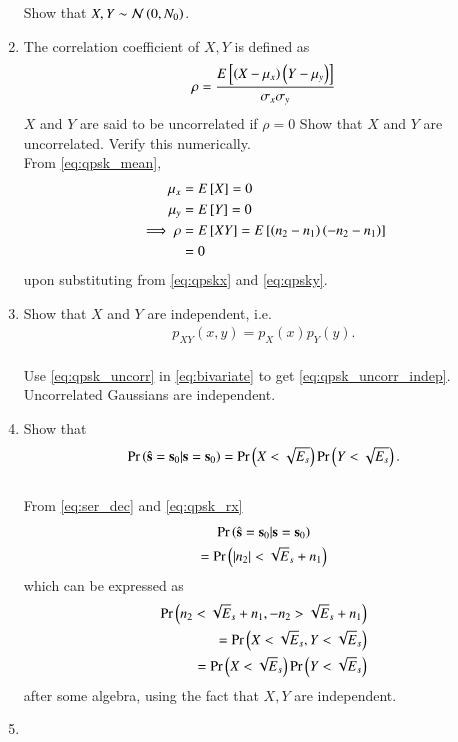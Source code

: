 \documentclass[journal,12pt,twocolumn]{IEEEtran}
\renewcommand\thesection{\arabic{section}}
\begin{document}
\begin{enumerate}[label=\arabic*.,ref=\thesection.\theenumi]
Show that $X,Y \sim \mathcal{N}\left(0,N_0\right)$.

\item The correlation coefficient of $X, Y$ is defined as
%
\begin{align}
\rho = \frac{E{}\left[\left(X-\mu_x\right)\left(Y-\mu_y\right)\right]}{\sigma_x\sigma_y}
\end{align}
%
$X$ and $Y$ are said to be uncorrelated if $\rho = 0$
Show that  $X$ and $Y$ are uncorrelated. 
Verify this numerically.
\\
\solution From \eqref{eq:qpsk_mean},
\begin{align}
\mu_x &= E{}\left[X\right] = 0
\\
\mu_y &= E{}\left[Y\right] = 0
\\
\implies \rho &= E{}\left[XY\right] = E{}\left[\left(n_2-n_1\right)\left(-n_2-n_1\right)\right] 
\nonumber \\
&= 0
\label{eq:qpsk_uncorr}
\end{align}
%
upon substituting from \eqref{eq:qpskx} and \eqref{eq:qpsky}.
\item
Show that $X$ and $Y$ are independent, i.e. 
\begin{align}
\label{eq:qpsk_uncorr_indep}
p_{XY}(x,y) = p_{X}(x)p_{Y}(y).
\end{align}
\\
\solution Use \eqref{eq:qpsk_uncorr} in 
\eqref{eq:bivariate} to get \eqref{eq:qpsk_uncorr_indep}.  Uncorrelated Gaussians are independent.

\item

Show that 
\begin{equation}
\Pr\left(\hat{\mathbf{s}} = \mathbf{s}_0|\mathbf{s} = \mathbf{s}_0\right) =\Pr\left( X < \sqrt{E_s}\right)\Pr\left(  Y < \sqrt{E_s}\right).
\end{equation}
\\
\solution From \eqref{eq:ser_dec}  and \eqref{eq:qpsk_rx}
%
\begin{multline}
\Pr\left(\hat{\mathbf{s}} = \mathbf{s}_0|\mathbf{s} = \mathbf{s}_0\right) 
\\
= \Pr\left(\left\vert n_2\right\vert < \sqrt{E}_s+n_1\right)
\end{multline}
%
which can be expressed as
%
\begin{align}
\Pr\left({n_2} < \sqrt{E}_s+n_1,-{n_2} > \sqrt{E}_s+n_1 \right)&
\\
= \Pr\left(X < \sqrt{E}_s,Y < \sqrt{E}_s \right)&
\\
=\Pr\left(X < \sqrt{E}_s\right)\Pr\left(Y < \sqrt{E}_s \right)&
\end{align}
%
after some algebra, using the fact that $X,Y$ are independent.
\item


\end{enumerate}
\end{document}
